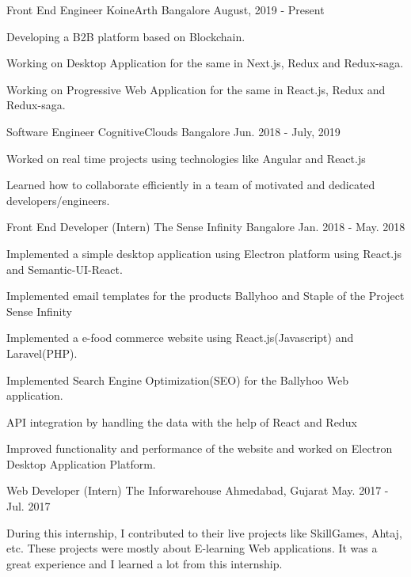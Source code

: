 \begin{cventries}
  \cventry
    {Front End Engineer}
    {KoineArth}
    {Bangalore}
    {August, 2019 - Present}
    {
      \begin{cvitems}
        \item{Developing a B2B platform based on Blockchain.}
        \item{Working on Desktop Application for the same in Next.js, Redux and Redux-saga.}
        \item{Working on Progressive Web Application for the same in React.js, Redux and Redux-saga.}
      \end{cvitems}
    }
  \cventry
    {Software Engineer}
    {CognitiveClouds}
    {Bangalore}
    {Jun. 2018 - July, 2019}
    {
      \begin{cvitems}
        \item{Worked on real time projects using technologies like Angular and React.js}        \item{Learned how to collaborate efficiently in a team of motivated and dedicated developers/engineers.}
      \end{cvitems}
    }
  \cventry
    {Front End Developer (Intern)}
    {The Sense Infinity}
    {Bangalore}
    {Jan. 2018 - May. 2018}
    {
      \begin{cvitems}
        \item{ Implemented a simple desktop application using Electron platform using React.js and Semantic-UI-React.}
        \item {Implemented email templates for the products Ballyhoo and Staple of the Project Sense Infinity}
        \item {Implemented a e-food commerce website using React.js(Javascript) and Laravel(PHP).}
        \item {Implemented Search Engine Optimization(SEO) for the Ballyhoo Web application.}
        \item {API integration by handling the data with the help of React and Redux}
        \item {Improved functionality and performance of the website and worked on Electron Desktop Application Platform.}
      \end{cvitems}
    }
  \cventry
    {Web Developer (Intern)}
    {The Inforwarehouse}
    {Ahmedabad, Gujarat}
    {May. 2017 - Jul. 2017}
    {
      \begin{cvitems}
        \item {During this internship, I contributed to their live projects like SkillGames, Ahtaj, etc. These projects were mostly about E-learning Web applications. It was a great experience and I learned a lot from this internship.}

\end{cvitems}}
\end{cventries}
